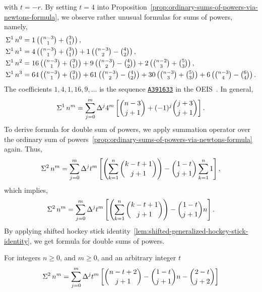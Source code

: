 with $t=-r$.
By setting $t=4$ into
Proposition~\eqref{prop:ordinary-sums-of-powers-via-newtons-formula},
we observe rather unusual formulas for sums of powers, namely,
\begin{align*}
  \Sigma^{1}\,{n}^{0} &= 1  \left( \tbinom{n-3}{1}
  + \tbinom{3}{1}  \right), \\
  \Sigma^{1}\,{n}^{1} &= 4  \left( \tbinom{n-3}{1}
  + \tbinom{3}{1}  \right)  + 1  \left( \tbinom{n-3}{2}
  - \tbinom{4}{2}  \right), \\
  \Sigma^{1}\,{n}^{2} &= 16 \left( \tbinom{n-3}{1}
  + \tbinom{3}{1}  \right)  + 9  \left( \tbinom{n-3}{2}
  - \tbinom{4}{2}  \right)
  + 2  \left( \tbinom{n-2}{3} + \tbinom{5}{3}  \right), \\
  \Sigma^{1}\,{n}^{3} &= 64 \left( \tbinom{n-3}{1}
  + \tbinom{3}{1}  \right)  + 61 \left( \tbinom{n-3}{2}
  - \tbinom{4}{2}  \right)
  + 30 \left( \tbinom{n-3}{3} + \tbinom{5}{3}  \right)
  + 6 \left( \tbinom{n-3}{4} - \tbinom{6}{4}  \right).
\end{align*}
The coefficients $1,4,1,16,9,\dots$ is the sequence
\href{https://oeis.org/A391633}{\texttt{A391633}}
in the OEIS~\cite{sloane2003line}.
In general,
\begin{align*}
  \Sigma^{1}\,{n}^{m} = \sum_{j=0}^{m} \Delta^{j} 4^m
  \left[
    \binom{n-3}{j+1} + (-1)^j \binom{j+3}{j+1}
  \right].
\end{align*}
To derive formula for double sum of powers,
we apply summation operator over the ordinary
sum of powers~\eqref{prop:ordinary-sums-of-powers-via-newtons-formula} again.
Thus,
\begin{align*}
  \Sigma^{2}\,{n}^{m} = \sum_{j=0}^{m} \Delta^{j} t^m
  \left[ \left( \sum_{k=1}^{n} \binom{k-t+1}{j+1} \right) -
    \binom{1-t}{j+1} \sum_{k=1}^{n} 1
  \right],
\end{align*}
which implies,
\begin{align*}
  \Sigma^{2}\,{n}^{m}
  = \sum_{j=0}^{m} \Delta^{j} t^m
  \left[
    \left( \sum_{k=1}^{n} \binom{k-t+1}{j+1} \right) - \binom{1-t}{j+1} n
  \right].
\end{align*}
By applying shifted hockey stick
identity~\eqref{lem:shifted-generalized-hockey-stick-identity},
we get formula for double sums of powers.
\begin{proposition}
  \label{prop:double-sums-of-powers-via-newtons-formula}
  For integers $n\geq 0$, and $m\geq 0$, and an arbitrary integer $t$
  \begin{align*}
    \Sigma^{2}\,{n}^{m}
    = \sum_{j=0}^{m} \Delta^{j} t^m
    \left[
      \binom{n-t+2}{j+1} - \binom{1-t}{j+1} n - \binom{2-t}{j+2}
    \right]
  \end{align*}
\end{proposition}


